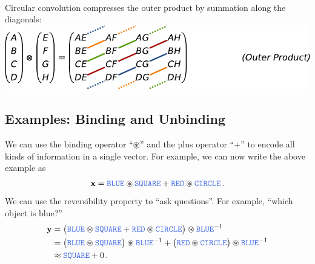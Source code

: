 \documentclass[10pt,letterpaper,oneside]{article}
\begin{document}
{\begin{align*}
\end{align*}
Circular convolution compresses the outer product by summation along the diagonals:\\[0.25cm]
\hspace*{1.315cm}\includegraphics{media/cconv_outer_product.pdf}
}


\subsection{Examples: Binding and Unbinding}
We can use the binding operator \enquote{$\circledast$} and the plus operator \enquote{$+$} to encode all kinds of information in a single vector. For example, we can now write the above example as
\begin{align*}
	\vec x = \Obj{BLUE} \CC \Obj{SQUARE} + \Obj{RED} \CC \Obj{CIRCLE} \,.
\end{align*}
We can use the reversibility property to \enquote{ask questions}. For example, \enquote{which object is blue?}
\begin{align*}
	\vec y &= \big( \Obj{BLUE} \CC \Obj{SQUARE} + \Obj{RED} \CC \Obj{CIRCLE} \big) \CC \Obj{BLUE}^{-1} \\
		   &= \big( \Obj{BLUE} \CC \Obj{SQUARE} \big) \CC \Obj{BLUE}^{-1} + \big( \Obj{RED} \CC \Obj{CIRCLE} \big) \CC \Obj{BLUE}^{-1} \\
		   &\approx \Obj{SQUARE} + 0 \,.
\end{align*}
\end{document}
